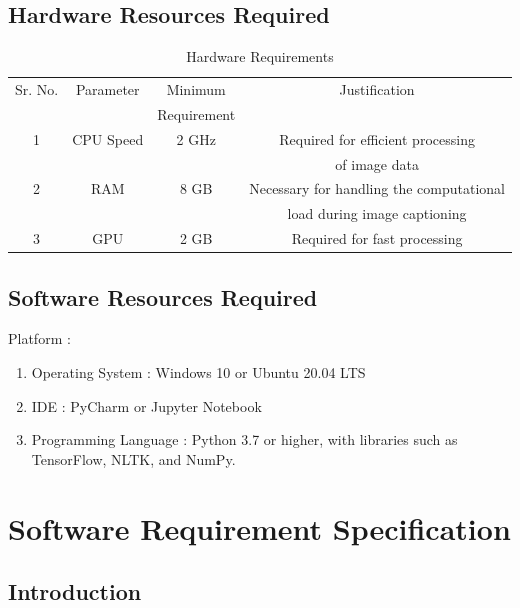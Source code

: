 \documentclass[oneside,a4paper,12pt]{report}
\begin{document}
\section{Hardware Resources Required}
\begin{table}[!htbp]
\begin{center}
\def\arraystretch{1.5}
  \begin{tabular}{| c | c | c | c |}
\hline
Sr. No. &	Parameter &	Minimum  & Justification \\
&&Requirement&\\
\hline
1 &	CPU Speed &	 2 GHz  & Required for efficient processing\\
&&& of image data \\
\hline
2 &	RAM  &	8 GB &  Necessary for handling the computational \\
&&& load during  image captioning\\
\hline
3 & GPU & 2 GB & Required for fast processing \\
 \hline
\end{tabular}
 \caption { Hardware Requirements }
 \label{tab:hreq}
\end{center}

\end{table}


\section{Software Resources Required}
Platform : 
\begin{enumerate}
\item Operating System : Windows 10 or Ubuntu 20.04 LTS
\item IDE : PyCharm or Jupyter Notebook
\item Programming Language : Python 3.7 or higher, with libraries such as TensorFlow, NLTK, and NumPy.
\end{enumerate}

\chapter{Software Requirement Specification  }
\section{Introduction}
\end{document}
